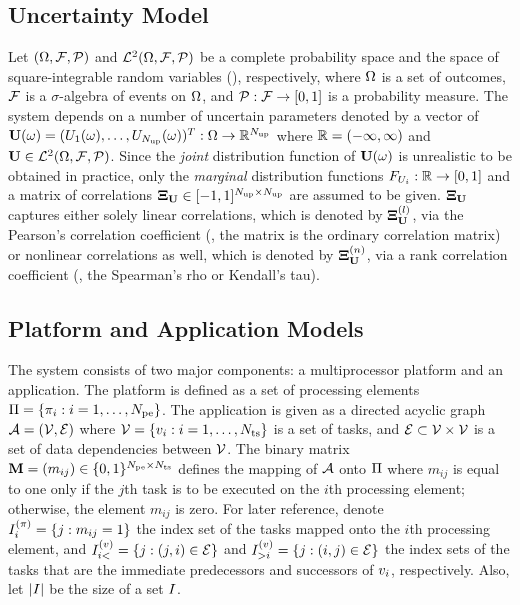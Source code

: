 \subsection{Uncertainty Model} 
Let $(\Omega, \mathcal{F}, \mathcal{P})$ and $\mathcal{L}^{2}(\Omega, \mathcal{F}, \mathcal{P})$ be a complete probability space \cite{durrett2010} and the space of square-integrable random variables (\rvs), respectively, where $\Omega$ is a set of outcomes, $\mathcal{F}$ is a $\sigma$-algebra of events on $\Omega$, and $\mathcal{P}: \mathcal{F} \to [0, 1]$ is a probability measure. The system depends on a number of uncertain parameters denoted by a vector of \rvs\ $\mathbf{U}(\omega) = (U_1(\omega), \dots, U_{N_\text{up}}(\omega))^T: \Omega \to \mathbb{R}^{N_\text{up}}$ where $\mathbb{R} = (-\infty, \infty)$ and $\mathbf{U} \in \mathcal{L}^{2}(\Omega, \mathcal{F}, \mathcal{P})$. Since the \emph{joint} distribution function of $\mathbf{U}(\omega)$ is unrealistic to be obtained in practice, only the \emph{marginal} distribution functions $F_{U_i}: \mathbb{R} \to [0, 1]$ and a matrix of correlations $\mathbf{\Xi}_{\mathbf{U}} \in [-1, 1]^{{N_\text{up}} \times {N_\text{up}}}$ are assumed to be given. $\mathbf{\Xi}_{\mathbf{U}}$ captures either solely linear correlations, which is denoted by $\mathbf{\Xi}^{(l)}_{\mathbf{U}}$, via the Pearson's correlation coefficient (\ie, the matrix is the ordinary correlation matrix) or nonlinear correlations as well, which is denoted by $\mathbf{\Xi}^{(n)}_{\mathbf{U}}$, via a rank correlation coefficient (\eg, the Spearman's rho or Kendall's tau).

\subsection{Platform and Application Models}  
The system consists of two major components: a multiprocessor platform and an application. The platform is defined as a set of processing elements $\Pi = \{ \pi_i: i = 1, \dots, {N_\text{pe}} \}$. The application is given as a directed acyclic graph $\mathcal{A} = (\mathcal{V}, \mathcal{E})$ where $\mathcal{V} = \{ v_i: i = 1, \dots, {N_\text{ts}} \}$ is a set of tasks, and $\mathcal{E} \subset \mathcal{V} \times \mathcal{V}$ is a set of data dependencies between $\mathcal{V}$. The binary matrix $\mathbf{M} = (m_{ij}) \in \{ 0, 1 \}^{{N_\text{pe}} \times {N_\text{ts}}}$ defines the mapping of $\mathcal{A}$ onto $\Pi$ where $m_{ij}$ is equal to one only if the $j$th task is to be executed on the $i$th processing element; otherwise, the element $m_{ij}$ is zero. For later reference, denote $I^{(\pi)}_i = \{ j: m_{ij} = 1 \}$ the index set of the tasks mapped onto the $i$th processing element, and $I^{(v)}_{i<} = \{ j: (j, i) \in \mathcal{E} \}$ and $I^{(v)}_{>i} = \{ j: (i, j) \in \mathcal{E} \}$ the index sets of the tasks that are the immediate predecessors and successors of $v_i$, respectively. Also, let $|I|$ be the size of a set $I$.

